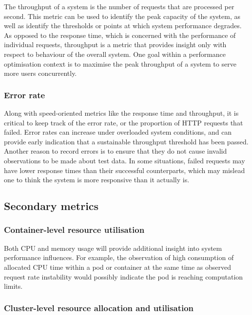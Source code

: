 The throughput of a system is the number of requests that are processed per second. This metric can be used to identify the peak capacity of the system, as well as identify the thresholds or points at which system performance degrades. As opposed to the response time, which is concerned with the performance of individual requests, throughput is a metric that provides insight only with respect to behaviour of the overall system. One goal within a performance optimisation context is to maximise the peak throughput of a system to serve more users concurrently.

\subsubsection{Error rate}

Along with speed-oriented metrics like the response time and throughput, it is critical to keep track of the error rate, or the proportion of HTTP requests that failed. Error rates can increase under overloaded system conditions, and can provide early indication that a sustainable throughput threshold has been passed. Another reason to record errors is to ensure that they do not cause invalid observations to be made about test data. In some situations, failed requests may have lower response times than their successful counterparts, which may mislead one to think the system is more responsive than it actually is.

\subsection{Secondary metrics}

\subsubsection{Container-level resource utilisation}

Both CPU and memory usage will provide additional insight into system performance influences. For example, the observation of high consumption of allocated CPU time within a pod or container at the same time as observed request rate instability would possibly indicate the pod is reaching computation limits.

\subsubsection{Cluster-level resource allocation and utilisation}

